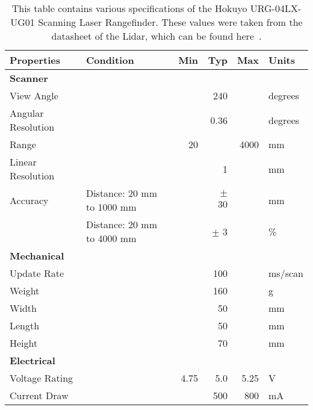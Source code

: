 \begin{table}
\begin{tabulary}{\textwidth}{|l||l|r|r|r|l|}
\hline
\textbf{Properties}& \textbf{Condition}         & \textbf{Min} & \textbf{Typ} & \textbf{Max} & \textbf{Units} \\	\hline\hline
\textbf{Scanner}   &                            &              &              &              &                \\	\hline
View Angle 	       &                            &              & 240          &              & degrees        \\	\hline
Angular Resolution &                            &              & 0.36         &              & degrees        \\	\hline
Range 	           &                            & 20           &              & 4000         & mm             \\	\hline 
Linear Resolution  &                            &              & 1            &              & mm             \\	\hline 
Accuracy           & Distance: 20 mm to 1000 mm &              & $\pm$ 30     &              & mm             \\	\hline 
        	       & Distance: 20 mm to 4000 mm &              & $\pm$ 3      &              & \%             \\	\hline \hline 
\textbf{Mechanical}&                            &              &              &              &                \\	\hline
Update Rate	       &                            &              & 100          &              & ms/scan        \\	\hline 
Weight             &                            &              & 160          &              & g              \\	\hline 
Width              &                            &              & 50           &              & mm             \\	\hline 
Length             &                            &              & 50           &              & mm             \\	\hline 
Height             &                            &              & 70           &              & mm             \\	\hline \hline
\textbf{Electrical}&                            &              &              &              &                \\	\hline 
Voltage Rating     &                            & 4.75         & 5.0          & 5.25         & V              \\	\hline 
Current Draw       &                            &              & 500          & 800          & mA             \\	\hline 
\end{tabulary} 
\caption{This table contains various specifications of the Hokuyo URG-04LX-UG01 Scanning Laser Rangefinder.
         These values were taken from the datasheet of the Lidar, which can be found here~\cite{urg_specs}.}
\label{tab:lidar_params1}
\end{table}




